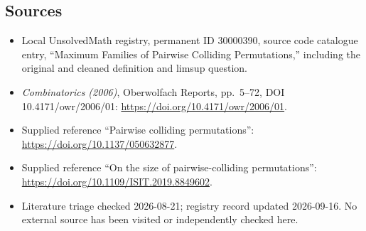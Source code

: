 \documentclass[11pt]{article}
\begin{document}
\subsection{Sources}
\begin{itemize}
\item Local UnsolvedMath registry, permanent ID 30000390, source code catalogue entry, ``Maximum Families of Pairwise Colliding Permutations,'' including the original and cleaned definition and limsup question.
\item \emph{Combinatorics (2006)}, Oberwolfach Reports, pp.\ 5--72, DOI 10.4171/owr/2006/01: \url{https://doi.org/10.4171/owr/2006/01}.
\item Supplied reference ``Pairwise colliding permutations'': \url{https://doi.org/10.1137/050632877}.
\item Supplied reference ``On the size of pairwise-colliding permutations'': \url{https://doi.org/10.1109/ISIT.2019.8849602}.
\item Literature triage checked 2026-08-21; registry record updated 2026-09-16. No external source has been visited or independently checked here.
\end{itemize}
\end{document}
